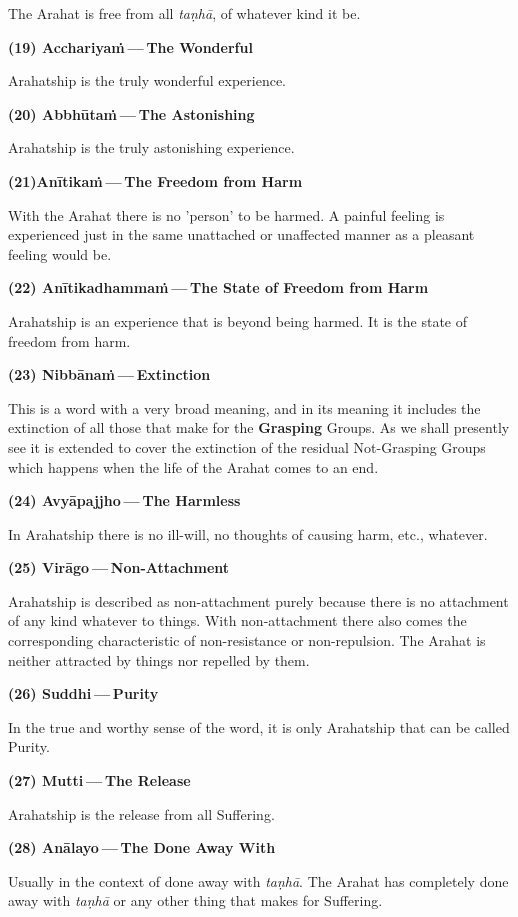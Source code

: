 The Arahat is free from all \emph{taṇhā}, of whatever kind it be.


\textbf{(19) Acchariyaṁ — The Wonderful}


Arahatship is the truly wonderful experience.


\textbf{(20) Abbhūtaṁ — The Astonishing}


Arahatship is the truly astonishing experience.


\textbf{(21)Anītikaṁ — The Freedom from Harm}


With the Arahat there is no 'person' to be harmed. A painful feeling is
experienced just in the same unattached or unaffected manner as a
pleasant feeling would be.


\textbf{(22) Anītikadhammaṁ — The State of Freedom from Harm}


Arahatship is an experience that is beyond being harmed. It is the state
of freedom from harm.


\textbf{(23) Nibbānaṁ — Extinction}


This is a word with a very broad meaning, and in its meaning it includes
the extinction of all those that make for the \textbf{Grasping} Groups. As we
shall presently see it is extended to cover the extinction of the
residual Not-Grasping Groups which happens when the life of the Arahat
comes to an end.


\textbf{(24) Avyāpajjho — The Harmless}


In Arahatship there is no ill-will, no thoughts of causing harm, etc.,
whatever.


\textbf{(25) Virāgo — Non-Attachment}


Arahatship is described as non-attachment purely because there is no
attachment of any kind whatever to things. With non-attachment there
also comes the corresponding characteristic of non-resistance or
non-repulsion. The Arahat is neither attracted by things nor repelled by
them.


\textbf{(26) Suddhi — Purity}


\label{suddhi}In the true and worthy sense of the word, it is only Arahatship that can
be called Purity.


\textbf{(27) Mutti — The Release}


Arahatship is the release from all Suffering.


\textbf{(28) Anālayo — The Done Away With}


Usually in the context of done away with \emph{taṇhā}. The Arahat has
completely done away with \emph{taṇhā} or any other thing that makes for
Suffering.


